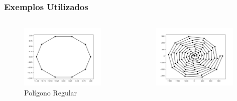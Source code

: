 \documentclass[aspectratio=169,usenames,dvipsnames]{beamer}
\begin{document}
\begin{frame}
\begin{columns}
\begin{center}
\begin{figure}
      \end{figure}
    \end{center}
  \end{columns}
\end{frame}

\begin{frame}
\frametitle{Exemplos Utilizados}
  \begin{columns}
    \begin{center}
        \begin{figure}
          \includegraphics[width=0.95\textwidth]{figures/regular_10.png}
          \caption{Polígono Regular}
        \end{figure}
    \end{center}
    \begin{center}
        \begin{figure}
          \includegraphics[width=0.95\textwidth]{figures/spiral_100.png}

\end{figure}
\end{center}
\end{columns}
\end{frame}
\end{document}
